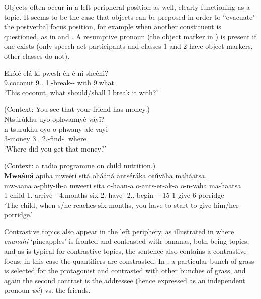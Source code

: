 \documentclass[output=paper]{langscibook}
\begin{document}
\z

Objects often occur in a left-peripheral position as well, clearly functioning as a topic. It seems to be the case that objects can be preposed in order to ``evacuate" the postverbal focus position, for example when another constituent is questioned, as in  and . A resumptive pronoun (the object marker in ) is present if one exists (only speech act participants and classes 1 and 2 have object markers, other classes do not).

\ea
\label{bkm:Ref95381718}
\gll
Ekólé  elá  ki{}-pwesh{}-ék{}-é  ni  sheéni?\\
9.coconut  9.\DEM{}.\PROX{}  1\SG{}.\SM{}-break-\DUR{}-\SBJV{}  with  9.what\\
\glt
‘This coconut, what should/shall I break it with?’\\

\z

\ea
\label{bkm:Ref129080305}
(Context: You see that your friend has money.)\\
Ntsúrúkhu uyo ophwannyé váyî?\\
\gll
n-tsurukhu  oyo  o-phwany-ale  vayi\\
3-money  3.\DEM{}.\MED{}  2\SG{}.\SM{}-find-\PFV{}.\CJ{}  where\\
\glt
‘Where did you get that money?’\\


\z

\ea
\label{bkm:Ref129080194}
(Context: a radio programme on child nutrition.)\\
\textbf{Mwaáná} apiha mweérí sitá ohááná antséráka o\textbf{ḿ}váha maháatsa.\\
\gll
mw-aana  a-phiy-ih-a  mweeri  sita  o-haan-a  o-ants-er-ak-a  o-n{}-vaha  ma-haatsa \\
1-child  1\SM{}.\SIT{}-arrive-\CAUS{}-\FV{}  4.months  six   2\SG{}.\SM{}-have-\FV{}  2\SG{}.\SM{}.\SIT{}-begin-\APPL{}-\DUR{}-\FV{}  15-1\OM{}{}-give  6-porridge\\
\glt
‘The child, when s/he reaches six months, you have to start to give him/her porridge.’

\z


Contrastive topics also appear in the left periphery, as illustrated in  where \textit{enanahi} ‘pineapples’ is fronted and contrasted with bananas, both being topics, and as is typical for contrastive topics, the sentence also contains a contrastive focus; in this case the quantifiers are constrasted. In , a particular bunch of grass is selected for the protagonist and contrasted with other bunches of grass, and again the second contrast is the addressee (hence expressed as an independent pronoun \textit{wé}) vs. the friends.
\end{document}
